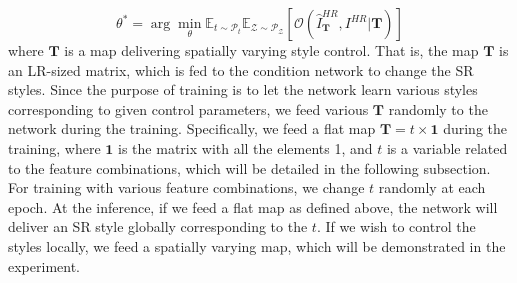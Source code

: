 \documentclass{article}
\begin{document}
\begin{equation}
{\theta}^\ast=\arg\min_{\theta}\mathbb{E}_{{t}\sim\mathcal{P}_{t}}\mathbb{E}_{\mathcal{Z}\sim\mathcal{P}_{\mathcal{Z}}}\left[\mathcal{O}\left(\hat{I}^{HR}_\mathbf{T},{I}^{HR}|\mathbf{T}\right)\right]
\label{eqn:optThetawT}
\end{equation}
where $\mathbf{T}$ is a map delivering spatially varying style control. That is, the map $\mathbf{T}$ is an LR-sized matrix, which is fed to the condition network to change the SR styles. Since the purpose of training is to let the network learn various styles corresponding to given control parameters, we feed various $\mathbf{T}$ randomly to the network during the training. Specifically, we feed a flat map $\mathbf{T} =t \times \mathbf{1}$ during the training, where $\mathbf{1}$ is the matrix with all the elements 1, and $t$ is a variable related to the feature combinations, which will be detailed in the following subsection. For training with various feature combinations, we change $t$ randomly at each epoch. At the inference, if we feed a flat map as defined above, the network will deliver an SR style globally corresponding to the $t$. If we wish to control the styles locally, we feed a spatially varying map, which will be demonstrated in the experiment.
\end{document}
